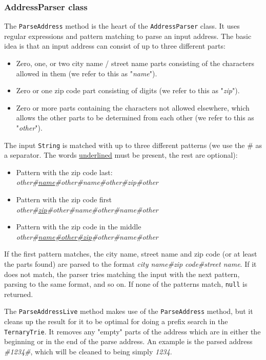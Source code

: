 \subsubsection{AddressParser class}
The \texttt{ParseAddress} method is the heart of the \texttt{AddressParser} class. It uses regular expressions and pattern matching to parse an input address. The basic idea is that an input address can consist of up to three different parts:
\begin{itemize}
	\item Zero, one, or two city name / street name parts consisting of the characters allowed in them (we refer to this as "\textit{name}").
	\item Zero or one zip code part consisting of digits (we refer to this as "\textit{zip}").
	\item Zero or more parts containing the characters not allowed elsewhere, which allows the other parts to be determined from each other (we refer to this as "\textit{other}").
\end{itemize}
The input \texttt{String} is matched with up to three different patterns (we use the \# as a separator. The words \underline{underlined} must be present, the rest are optional):
\begin{itemize}
	\item Pattern with the zip code last: \\
		\textit{other\#\underline{name}\#other\#name\#other\#zip\#other}
	\item Pattern with the zip code first \\
	\textit{other\#\underline{zip}\#other\#name\#other\#name\#other}
	\item Pattern with the zip code in the middle \\
	\textit{other\#\underline{name\#other\#zip}\#other\#name\#other}
\end{itemize}
If the first pattern matches, the city name, street name and zip code (or at least the parts found) are parsed to the format \textit{city name\#zip code\#street name}. If it does not match, the parser tries matching the input with the next pattern, parsing to the same format, and so on. If none of the patterns match, \texttt{null} is returned.

The \texttt{ParseAddressLive} method makes use of the \texttt{ParseAddress} method, but it cleans up the result for it to be optimal for doing a prefix search in the \texttt{TernaryTrie}. It removes any "empty" parts of the address which are in either the beginning or in the end of the parse address. An example is the parsed address \textit{\#1234\#}, which will be cleaned to being simply \textit{1234}.

